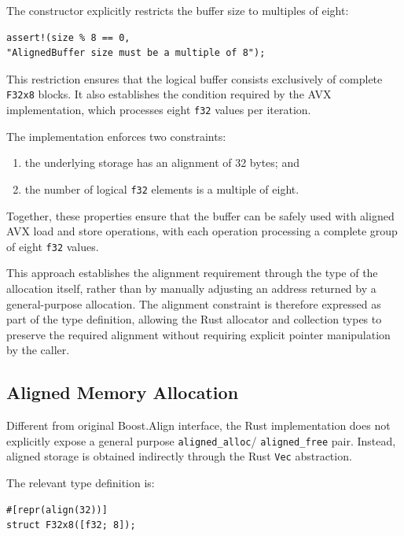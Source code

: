 The constructor explicitly restricts the buffer size to multiples of eight:

\begin{lstlisting}[style=rustblock]
assert!(size % 8 == 0,
"AlignedBuffer size must be a multiple of 8");
\end{lstlisting}

This restriction ensures that the logical buffer consists exclusively of complete \lstinline|F32x8| blocks. 
It also establishes the condition required by the AVX implementation, 
which processes eight \lstinline|f32| values per iteration.

The implementation enforces two constraints:

\begin{enumerate}
\item the underlying storage has an alignment of 32 bytes; and
\item the number of logical \lstinline|f32| elements is a multiple of eight.
\end{enumerate}

Together, these properties ensure that the buffer can be safely used with aligned AVX load and store operations, 
with each operation processing a complete group of eight \lstinline|f32| values.

This approach establishes the alignment requirement through the type of the allocation itself, 
rather than by manually adjusting an address returned by a general-purpose allocation. 
The alignment constraint is therefore expressed as part of the type definition, 
allowing the Rust allocator and collection types to preserve the required alignment
without requiring explicit pointer manipulation by the caller.


\subsection{Aligned Memory Allocation}

Different from original Boost.Align interface, the Rust implementation does not explicitly expose a 
general purpose \lstinline|aligned_alloc|/ \lstinline|aligned_free| pair. 
Instead, aligned storage is obtained indirectly through the Rust \lstinline|Vec| abstraction.

The relevant type definition is:

\begin{lstlisting}[style=rustblock]
#[repr(align(32))]
struct F32x8([f32; 8]);
\end{lstlisting}

